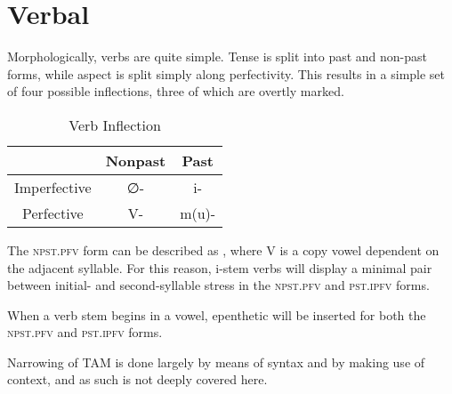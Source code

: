 \chapter{Verbal}

Morphologically, verbs are quite simple. Tense is split into past and non-past forms, while aspect is split simply along perfectivity. This results in a simple set of four possible inflections, three of which are overtly marked.

\begin{table}[ht]
  \centering
  \begin{tabular}{*{3}{c}}
    \toprule
                 & Nonpast & Past  \\\midrule
    Imperfective & ∅-      & i-    \\
    Perfective   & V-      & m(u)- \\
    \bottomrule
  \end{tabular}
  \caption{Verb Inflection}
  \label{table:verb-inflection}
\end{table}

The \textsc{npst.pfv} form can be described as , where V is a copy vowel dependent on the adjacent syllable. For this reason, i-stem verbs will display a minimal pair between initial- and second-syllable stress in the \textsc{npst.pfv} and \textsc{pst.ipfv} forms.

When a verb stem begins in a vowel, epenthetic  will be inserted for both the \textsc{npst.pfv} and \textsc{pst.ipfv} forms.

Narrowing of TAM is done largely by means of syntax and by making use of context, and as such is not deeply covered here.